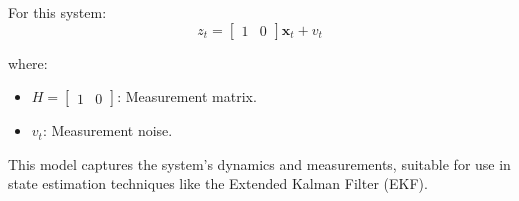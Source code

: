 \documentclass{article}
\begin{document}
For this system:
\[
z_t =
\begin{bmatrix}
1 & 0
\end{bmatrix}
\mathbf{x}_t + v_t
\]

where:
\begin{itemize}
    \item \( H = \begin{bmatrix} 1 & 0 \end{bmatrix} \): Measurement matrix.
    \item \( v_t \): Measurement noise.
\end{itemize}

This model captures the system's dynamics and measurements, suitable for use in state estimation techniques like the Extended Kalman Filter (EKF).
\end{document}
